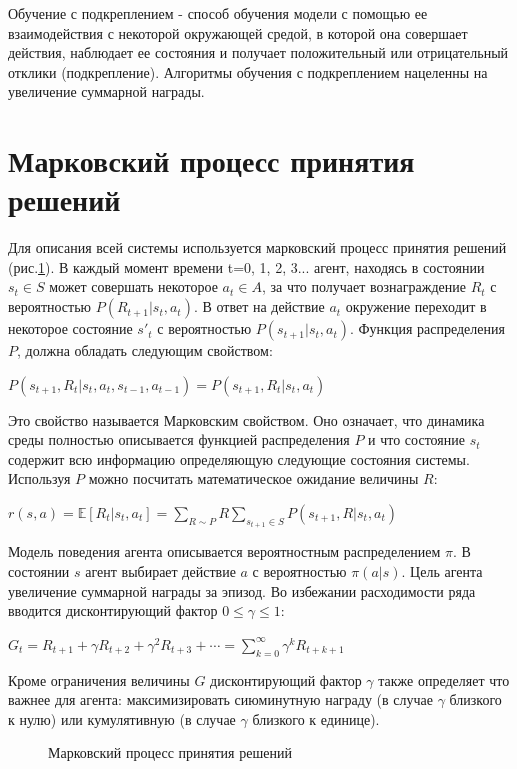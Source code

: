 \documentclass{mipt-thesis-bs}
\begin{document}
Обучение с подкреплением - способ обучения модели с помощью ее взаимодействия с некоторой окружающей средой, в которой она совершает действия, наблюдает ее состояния и получает положительный или отрицательный отклики (подкрепление). Алгоритмы обучения с подкреплением нацеленны на увеличение суммарной награды.

\section{Марковский процесс принятия решений}
Для описания всей системы используется марковский процесс принятия решений (рис.\ref{mdp}). В каждый момент времени t=0, 1, 2, 3... агент, находясь в состоянии $s_t\in S$ может совершать некоторое $a_t\in A$, за что получает вознаграждение $R_t$ с вероятностью $P(R_{t+1}|s_t,a_t)$. В ответ на действие $a_t$ окружение переходит в некоторое состояние $s'_t$ с вероятностью $P(s_{t+1}|s_t,a_t)$. Функция распределения $P$, должна обладать следующим свойством:

$P(s_{t+1}, R_{t}|s_t,a_t,s_{t-1},a_{t-1}) = P(s_{t+1}, R_{t}|s_t,a_t)$

Это свойство называется Марковским свойством. Оно означает, что динамика среды полностью описывается функцией распределения $P$ и что состояние $s_t$ содержит всю информацию определяющую следующие состояния системы. Используя $P$ можно посчитать математическое ожидание величины $R$:

$r(s, a) = \mathbb{E}[R_{t} | s_t, a_t]=\sum_{R \sim P} R \sum_{s_{t+1} \in S} P(s_{t+1}, R | s_t, a_t)$

Модель поведения агента описывается вероятностным распределением $\pi$. В состоянии $s$ агент выбирает действие $a$ с вероятностью $\pi(a|s)$. Цель агента увеличение суммарной награды за эпизод. Во избежании расходимости ряда вводится дисконтирующий фактор $0 \leq\gamma\leq 1$:

$G_{t} = R_{t+1}+\gamma R_{t+2}+\gamma^{2} R_{t+3}+\cdots=\sum_{k=0}^{\infty} \gamma^{k} R_{t+k+1}$

Кроме ограничения величины $G$ дисконтирующий фактор $\gamma$ также определяет что важнее для агента: максимизировать сиюминутную награду (в случае $\gamma$ близкого к нулю) или кумулятивную (в случае $\gamma$ близкого к единице).

\begin{figure}[ht]
    \centering
    \vspace{-0.2cm}
    \caption{Марковский процесс принятия решений}
    \label{mdp}
\end{figure}
\end{document}
